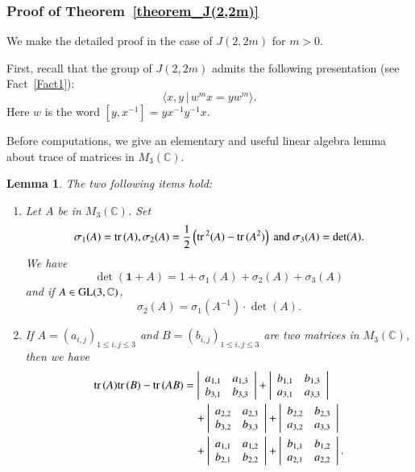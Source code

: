 \documentclass[a4paper]{amsart}
\theoremstyle{plain}
\newtheorem{lemma}[theorem]{Lemma}%
\theoremstyle{definition}
\theoremstyle{remark}
\newcommand{\C}{{\mathbb C}}
\newcommand{\I}{\mathbf{1}}
\newcommand{\trace}{{\rm tr}\,}
\begin{document}
\subsubsection{Proof of Theorem~\ref{theorem_J(2,2m)}}
We make the detailed proof in the case of  $J(2, 2m)$ for $m>0$.

First, recall that the group of $J(2, 2m)$ admits the following presentation (see Fact~\ref{Fact1}): 
\[
\langle x, y \,|\, w^m x  = y w^m \rangle.
\]
Here $w$ is the word $[y, x^{-1}] = yx^{-1}y^{-1}x$.

Before computations, we give an elementary and useful {linear algebra} lemma about trace of matrices in $M_3(\C)$.

\begin{lemma} \label{lemma_sigma_2}
The two following items hold:
\begin{enumerate}
\item
    Let $A$ be in $M_3(\C)$.  Set
\[
\sigma_1(A) = \trace(A), 
\sigma_2(A) = \frac{1}{2} \left( \trace^2(A)-\trace(A^2)\right) \text{ and } \sigma_3(A) = \det (A).
\] 
    We have 
\[
\det(\I + A) = 1 + \sigma_1(A) + \sigma_2(A) + \sigma_3(A)
\]  
    and if $A \in {\rm GL}(3, \C)$,
$$
\sigma_2(A) = \sigma_1(A^{-1})\cdot \det(A).
$$
\item
    If $A = {(a_{i, j})}_{1 \leq i, j \leq 3}$ and $B = {(b_{i, j})}_{1 \leq i, j \leq 3}$ are two matrices in $M_3(\C)$,
    then we have 
    \begin{align*}
\trace(A)\trace(B) - \trace(AB) 
&=
    \left|
    \begin{array}{cc}
    a_{1, 1} & a_{1, 3} \\
    b_{3, 1} & b_{3, 3}
    \end{array}
    \right|
    +
    \left|
    \begin{array}{cc}
    b_{1, 1} & b_{1, 3} \\
    a_{3, 1} & a_{3, 3}
    \end{array}
    \right|\\
& \quad +
    \left|
    \begin{array}{cc}
    a_{2, 2} & a_{2, 3} \\
    b_{3, 2} & b_{3, 3}
    \end{array}
    \right|
    +
    \left|
    \begin{array}{cc}
    b_{2, 2} & b_{2, 3} \\
    a_{3, 2} & a_{3, 3}
    \end{array}
    \right|\\
&\quad +
    \left|
    \begin{array}{cc}
    a_{1, 1} & a_{1, 2} \\
    b_{2, 1} & b_{2, 2}
    \end{array}
    \right|
    +
    \left|
    \begin{array}{cc}
    b_{1, 1} & b_{1, 2} \\
    a_{2, 1} & a_{2, 2}
    \end{array}
    \right|.
    \end{align*}
\end{enumerate}
\end{lemma}
\end{document}
